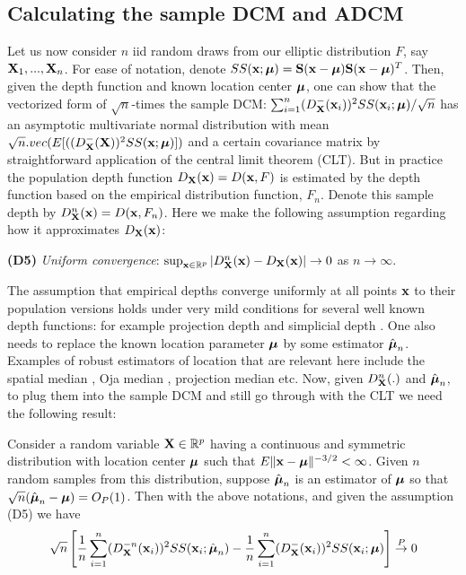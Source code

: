 \subsection{Calculating the sample DCM and ADCM}
Let us now consider $n$ iid random draws from our elliptic distribution $F$, say ${\mathbf{X}}_1,...,{\mathbf{X}}_n$. For ease of notation, denote $SS({\bf{x}}; {\boldsymbol{\mu}}) = {\mathbf{S}}({\bf{x}} - {\boldsymbol{\mu}}) {\mathbf{S}}({\bf{x}} - {\boldsymbol{\mu}})^T$. Then, given the depth function and known location center ${\boldsymbol{\mu}}$, one can show that the vectorized form of $\sqrt n$-times the sample DCM: $\sum_{i=1}^n (D^-_{\mathbf{X}}({\bf{x}}_i))^2SS({\bf{x}}_i; {\boldsymbol{\mu}}) /\sqrt{n}$  has an asymptotic multivariate normal distribution with mean $\sqrt n.vec(E[( (D^-_{\mathbf{X}} ({\mathbf{X}}))^2 SS({\bf{x}}; {\boldsymbol{\mu}})])$ and a certain covariance matrix by straightforward application of the central limit theorem (CLT). But in practice the population depth function $D_{\mathbf{X}}({\bf{x}}) = D({\bf{x}}, F)$ is estimated by the depth function based on the empirical distribution function, $F_n$. Denote this sample depth by $D^n_{\mathbf{X}} ({\bf{x}}) = D({\bf{x}}, F_n)$. Here we make the following assumption regarding how it approximates $D_{\mathbf{X}}({\bf{x}})$:

\vspace{1em}
\noindent\textbf{(D5)} \textit{Uniform convergence}: $\sup_{{\bf{x}} \in \mathbb R^p} | D^n_{\mathbf{X}} ({\bf{x}}) - D_{\mathbf{X}} ({\bf{x}}) | \rightarrow 0$ as $n \rightarrow \infty $.
\vspace{1em}

The assumption that empirical depths converge uniformly at all points ${\bf{x}}$ to their population versions holds under very mild conditions for several well known depth functions: for example projection depth \citep{zuo03} and simplicial depth \citep{Dumbgen92}. One also needs to replace the known location parameter ${\boldsymbol{\mu}}$ by some estimator $\hat{{\boldsymbol{\mu}}}_n$. Examples of robust estimators of location that are relevant here include the spatial median \citep{haldane48,brown83}, Oja median \citep{oja83}, projection median \citep{zuo03} etc. Now, given $D^n_{\mathbf{X}}(.)$ and $\hat {{\boldsymbol{\mu}}}_n$, to plug them into the sample DCM and still go through with the CLT we need the following result:

\begin{Lemma} \label{Lemma:lemma1}
Consider a random variable ${\mathbf{X}} \in \mathbb{R}^p$ having a continuous and symmetric distribution with location center ${\boldsymbol{\mu}}$ such that $E\|{\bf{x}} - {\boldsymbol{\mu}} \|^{-3/2} < \infty$. Given $n$ random samples from this distribution, suppose $\hat{{\boldsymbol{\mu}}}_n$ is an estimator of ${\boldsymbol{\mu}}$ so that $\sqrt n (\hat{{\boldsymbol{\mu}}}_n - {\boldsymbol{\mu}}) = O_P(1) $. Then with the above notations, and given the assumption (D5) we have
%
$$ \sqrt n \left[
\frac{1}{n} \sum_{i=1}^n (D^{-n}_{\mathbf{X}} ({\bf{x}}_i))^2 SS({\bf{x}}_i; \hat{{\boldsymbol{\mu}}}_n) -
\frac{1}{n} \sum_{i=1}^n (D^-_{\mathbf{X}} ({\bf{x}}_i))^2 SS({\bf{x}}_i; {\boldsymbol{\mu}}) \right]
\stackrel{P}{\rightarrow} 0 $$
\end{Lemma}

